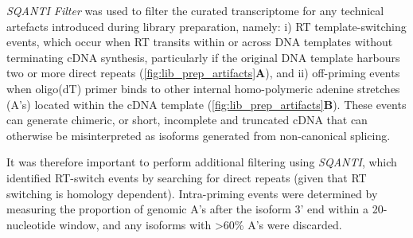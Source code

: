 \textit{SQANTI Filter} was used to filter the curated transcriptome for any technical artefacts introduced during library preparation, namely: i) RT template-switching events, which occur when RT transits within or across DNA templates without terminating cDNA synthesis, particularly if the original DNA template harbours two or more direct repeats\cite{Cocquet2006} (\cref{fig:lib_prep_artifacts}\textbf{A}), and ii) off-priming events when oligo(dT) primer binds to other internal homo-polymeric adenine stretches (A's) located within the cDNA template\cite{Conesa2016} (\cref{fig:lib_prep_artifacts}\textbf{B}). These events can generate chimeric, or short, incomplete and truncated cDNA that can otherwise be misinterpreted as isoforms generated from non-canonical splicing\cite{Houseley2010}. 

It was therefore important to perform additional filtering using \textit{SQANTI}, which identified RT-switch events by searching for direct repeats (given that RT switching is homology dependent). Intra-priming events were determined by measuring the proportion of genomic A's after the isoform 3' end within a 20-nucleotide window, and any isoforms with >60\% A's were discarded. 

